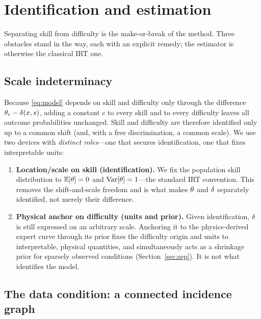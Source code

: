 \section{Identification and estimation}
\label{sec:ident}

Separating skill from difficulty is the make-or-break of the method. Three
obstacles stand in the way, each with an explicit remedy; the estimator is
otherwise the classical IRT one.

\subsection{Scale indeterminacy}

Because \eqref{eq:model} depends on skill and difficulty only through the
difference $\theta_r - \delta(x,s)$, adding a constant $c$ to every
skill and to every difficulty leaves all outcome probabilities unchanged. Skill
and difficulty are therefore identified only up to a common shift (and, with a
free discrimination, a common scale). We use two devices with \emph{distinct
roles}---one that secures identification, one that fixes interpretable units:
\begin{enumerate}
  \item \textbf{Location/scale on skill (identification).} We fix the population
    skill distribution to $\mathbb{E}[\theta] = 0$ and
    $\mathrm{Var}[\theta] = 1$---the standard IRT convention. This removes the
    shift-and-scale freedom and is what makes $\theta$ and $\delta$ separately
    identified, not merely their difference.
  \item \textbf{Physical anchor on difficulty (units and prior).} Given
    identification, $\delta$ is still expressed on an arbitrary scale. Anchoring it
    to the physics-derived expert curve through its prior fixes the difficulty
    origin and units to interpretable, physical quantities, and simultaneously
    acts as a shrinkage prior for sparsely observed conditions
    (Section~\ref{sec:sep}). It is not what identifies the model.
\end{enumerate}

\subsection{The data condition: a connected incidence graph}
\label{sec:graph}

